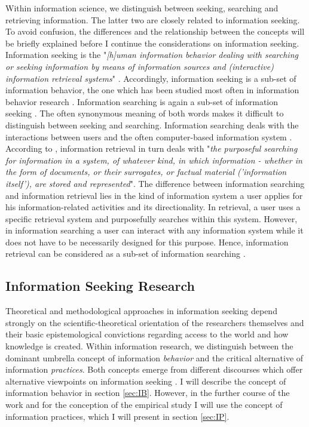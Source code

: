 \documentclass[12pt, a4paper, titlepage, oneside, abstract=true, toc=listof, toc=bibliography, BCOR=1cm]{scrreprt}
\begin{document}
Within information science, we distinguish between seeking, searching and retrieving information. The latter two are closely related to information seeking. To avoid confusion, the differences and the relationship between the concepts will be briefly explained before I continue the considerations on information seeking. Information seeking is the "\textit{[h]uman information behavior dealing with searching or seeking information by means of information sources and (interactive) information retrieval systems}" \citep[p. 21]{Ingwersen2005}. Accordingly, information seeking is a sub-set of information behavior, the one which has been studied most often in information behavior research \citep{Greifeneder2014}. Information searching is again a sub-set of information seeking \citep[p. 263]{Wilson1999}. The often synonymous meaning of both words makes it difficult to distinguish between seeking and searching. Information searching deals with the interactions between users and the often computer-based information system \citep[p. 261]{Wilson1999}. According to \citet{SparckJones1997}, information retrieval in turn deals with "\textit{the purposeful searching for information in a system, of whatever kind, in which information - whether in the form of documents, or their surrogates, or factual material ('information itself'), are stored and represented}". The difference between information searching and information retrieval lies in the kind of information system a user applies for his information-related activities and its directionality. In retrieval, a user uses a specific retrieval system and purposefully searches within this system. However, in information searching a user can interact with any information system while it does not have to be necessarily designed for this purpose. Hence, information retrieval can be considered as a sub-set of information searching \citep{Bawden2007}. 

\subsection{Information Seeking Research}

Theoretical and methodological approaches in information seeking depend strongly on the scientific-theoretical orientation of the researchers themselves and their basic epistemological convictions regarding access to the world and how knowledge is created. Within information research, we distinguish between the dominant umbrella concept of information \textit{behavior} and the critical alternative of information \textit{practices}. Both concepts emerge from different discourses which offer alternative viewpoints on information seeking \citep{Savolainen2007}. I will describe the concept of information behavior in section \ref{sec:IB}. However, in the further course of the work and for the conception of the empirical study I will use the concept of information practices, which I will present in section \ref{sec:IP}.
\end{document}
